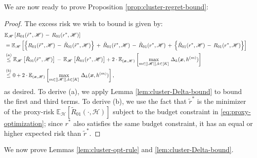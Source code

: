 We are now ready to prove Proposition \ref{prop:cluster-regret-bound}:
\begin{proof}
The excess risk we wish to bound is given by:
\begin{align*}
    \lefteqn{
    \mathbb{E}_{\mathscr{H}}\left[ 
    R_{01}(\tilde{r}^*,\mathscr{H}) \,-\, {R}_{01}(r^*,\mathscr{H})
    \right]
    }
    \\ 
    &=  
    \mathbb{E}_{\mathscr{H}}\left[ 
    \Big\{R_{01}(\tilde{r}^*,\mathscr{H})
    \,-\, \tilde{R}_{01}(\tilde{r}^*,\mathscr{H})\Big\}
    \,+\, \tilde{R}_{01}(\tilde{r}^*,\mathscr{H})
    \,-\, \tilde{R}_{01}({r}^*,\mathscr{H})
    \,+\, \Big\{\tilde{R}_{01}({r}^*,\mathscr{H})
    \,-\, {R}_{01}(r^*,\mathscr{H})\Big\} 
    \right]
    \\
    &\stackrel{(a)}{\leq}
    \mathbb{E}_{\mathscr{H}}\left[ \tilde{R}_{01}(\tilde{r}^*,\mathscr{H}) \right]
    \,-\, 
    \mathbb{E}_{\mathscr{H}}\left[ \tilde{R}_{01}({r}^*,\mathscr{H}) \right] + 2\cdot\mathbb{E}_{(\bx, \mathscr{H})}\left[\max_{m\in[|\mathscr{H}|], k\in[K]}\,\Delta_{k}(\bx, h^{(m)})\right]\\
    &\stackrel{(b)}{\leq}
    0 + 2\cdot\mathbb{E}_{(\bx, \mathscr{H})}\left[\max_{m\in[|\mathscr{H}|], k\in[K]}\,\Delta_{k}(\bx, h^{(m)})\right],
\end{align*}
as desired. 
To derive (a), we apply Lemma \ref{lem:cluster-Delta-bound} to bound the first and third terms. To derive (b), we use the fact that $\tilde{r}^*$  is the minimizer of the proxy-risk $ \mathbb{E}_{\mathscr{H}}\left[ \tilde{R}_{01}(\cdot,\mathscr{H}) \right] $ subject to the budget constraint in  \eqref{eq:proxy-optimization}; since $r^*$ also  satisfies the same budget constraint, it has an equal or higher expected risk than $\tilde{r}^*$.
\end{proof}



We now prove Lemmas \ref{lem:cluster-opt-rule} and \ref{lem:cluster-Delta-bound}.


